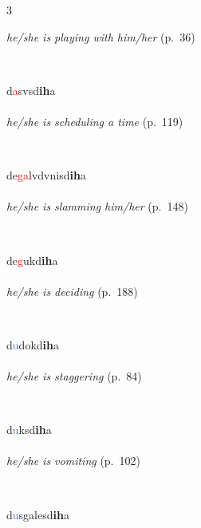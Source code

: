 \documentclass[oneside,openany]{book}%
\begin{document}
\begin{multicols}{3}
\begin{minipage}[t]{\linewidth}
\noindent \textit{he/she is playing with him/her} (p.~36)
\end{minipage}\\[1em]%
\begin{minipage}[t]{\linewidth}
\raggedright\noindent d\textcolor{Red}{a}svsd\textbf{ih}a\\
\\
\noindent \textit{he/she is scheduling a time} (p.~119)
\end{minipage}\\[1em]%
\begin{minipage}[t]{\linewidth}
\raggedright\noindent de\textcolor{Red}{ga}lvdvnisd\textbf{ih}a\\
\\
\noindent \textit{he/she is slamming him/her} (p.~148)
\end{minipage}\\[1em]%
\begin{minipage}[t]{\linewidth}
\raggedright\noindent de\textcolor{Red}{g}ukd\textbf{ih}a\\
\\
\noindent \textit{he/she is deciding} (p.~188)
\end{minipage}\\[1em]%
\begin{minipage}[t]{\linewidth}
\raggedright\noindent d\textcolor{RoyalBlue}{u}dokd\textbf{ih}a\\
\\
\noindent \textit{he/she is staggering} (p.~84)
\end{minipage}\\[1em]%
\begin{minipage}[t]{\linewidth}
\raggedright\noindent d\textcolor{RoyalBlue}{u}ksd\textbf{ih}a\\
\\
\noindent \textit{he/she is vomiting} (p.~102)
\end{minipage}\\[1em]%
\begin{minipage}[t]{\linewidth}
\raggedright\noindent d\textcolor{RoyalBlue}{u}sgalesd\textbf{ih}a\\

\end{minipage}
\end{multicols}
\end{document}
